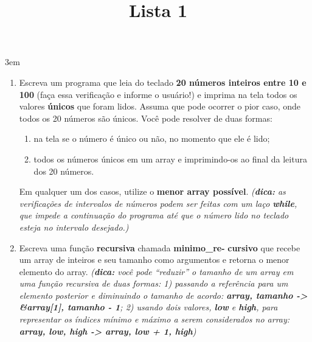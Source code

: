 \documentclass[a4paper,11pt]{article}
\title{Lista 1}
\begin{document}
\maketitle

\emergencystretch 3em

\begin{multicols*}{2}
\setlength{\leftmargini}{0pt}
\begin{enumerate}
  \item Escreva um programa que leia do teclado \textbf{20 números inteiros entre 10 e 100} (faça essa verificação e informe o usuário!) e imprima na tela todos os valores \textbf{únicos} que foram lidos. Assuma que pode ocorrer o pior caso, onde todos os 20 números são únicos. Você pode resolver de duas formas:

    \begin{enumerate}
      \item na tela se o número é único ou não, no momento que ele é lido;
      \item todos os números únicos em um array e imprimindo-os ao final da leitura dos 20 números.
    \end{enumerate}

  Em qualquer um dos casos, utilize o \textbf{menor array possível}. \textit{(\textbf{dica:} as verificações de intervalos de números podem ser feitas com um laço \textbf{while}, que impede a continuação do programa até que o número lido  no teclado esteja no intervalo desejado.)}

  \item Escreva uma função \textbf{recursiva} chamada \textbf{minimo\_re-} \textbf{cursivo} que recebe um array de inteiros e seu tamanho como argumentos e retorna o menor elemento do array. \textit{(\textbf{dica:} você pode ``reduzir'' o tamanho de um array em uma função recursiva de duas formas: 1) passando a referência para um elemento posterior e diminuindo o tamanho de acordo: \textbf{array, tamanho -> \&array{[}1{]}, tamanho - 1}; 2) usando dois valores, \textbf{low} e \textbf{high}, para representar os índices mínimo e máximo a serem considerados no array: \textbf{array, low, high -> array, low + 1, high})}


\end{enumerate}
\end{multicols*}
\end{document}

